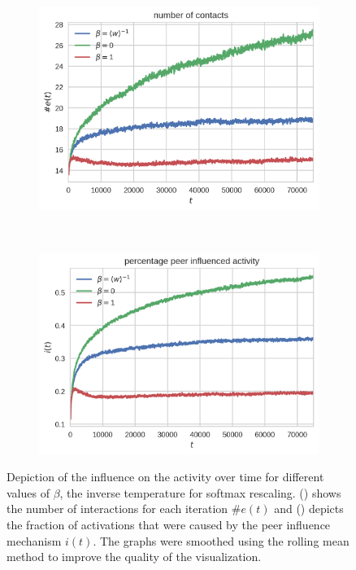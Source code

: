 \begin{figure}[htbp]
\centering
\begin{subfigure}[b]{0.485\textwidth}
  \includegraphics[width=\textwidth]{figures/number-of-contacts-beta}
  \caption{}
  \label{fig:number-of-contacts-beta}
\end{subfigure}
~
\begin{subfigure}[b]{0.485\textwidth}
  \includegraphics[width=\textwidth]{figures/percentage-influenced-activity-beta}
  \caption{}
\label{fig:percentage-influenced-activity-beta}
\end{subfigure}

\caption[Network activity with different rescaling scenarios]{Depiction of the influence on the activity over time for different values of \( \beta \), the inverse temperature for softmax rescaling. () shows the number of interactions for each iteration \( \#e(t) \) and () depicts the fraction of activations that were caused by the peer influence mechanism \( i(t) \). The graphs were smoothed using the rolling mean method to improve the quality of the visualization.}
\label{fig:activity-beta-scenarios}
\end{figure}


